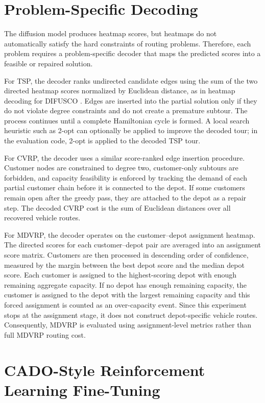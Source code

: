 \section{Problem-Specific Decoding}
\label{sec:problem-specific-decoding}

The diffusion model produces heatmap scores, but heatmaps do not automatically satisfy the hard constraints of routing problems. Therefore, each problem requires a problem-specific decoder that maps the predicted scores into a feasible or repaired solution.

For TSP, the decoder ranks undirected candidate edges using the sum of the two directed heatmap scores normalized by Euclidean distance, as in heatmap decoding for DIFUSCO \citep{sun2023difusco}. Edges are inserted into the partial solution only if they do not violate degree constraints and do not create a premature subtour. The process continues until a complete Hamiltonian cycle is formed. A local search heuristic such as 2-opt \citep{croes1958method} can optionally be applied to improve the decoded tour; in the evaluation code, 2-opt is applied to the decoded TSP tour.

For CVRP, the decoder uses a similar score-ranked edge insertion procedure. Customer nodes are constrained to degree two, customer-only subtours are forbidden, and capacity feasibility is enforced by tracking the demand of each partial customer chain before it is connected to the depot. If some customers remain open after the greedy pass, they are attached to the depot as a repair step. The decoded CVRP cost is the sum of Euclidean distances over all recovered vehicle routes.

For MDVRP, the decoder operates on the customer--depot assignment heatmap. The directed scores for each customer--depot pair are averaged into an assignment score matrix. Customers are then processed in descending order of confidence, measured by the margin between the best depot score and the median depot score. Each customer is assigned to the highest-scoring depot with enough remaining aggregate capacity. If no depot has enough remaining capacity, the customer is assigned to the depot with the largest remaining capacity and this forced assignment is counted as an over-capacity event. Since this experiment stops at the assignment stage, it does not construct depot-specific vehicle routes. Consequently, MDVRP is evaluated using assignment-level metrics rather than full MDVRP routing cost.

\section{CADO-Style Reinforcement Learning Fine-Tuning}
\label{sec:cado-style-finetuning}

